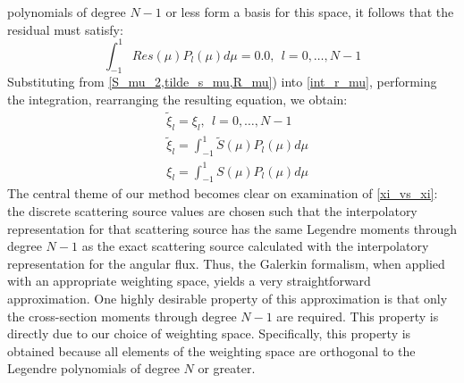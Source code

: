 polynomials of degree $N-1$ or less form a basis for this space, it follows
that the residual must satisfy:
\begin{equation}
\int_{-1}^1 Res(\mu) P_l(\mu) d\mu = 0.0,\ \ l=0,\hdots,N-1
\label{int_r_mu}
\end{equation}
Substituting from \cref{S_mu_2,tilde_s_mu,R_mu}) into \cref{int_r_mu}, 
performing the integration, rearranging the resulting equation, we obtain:
\begin{align}
&\tilde{\xi}_l = \xi_l,\ \ l=0,\hdots,N-1 \label{xi_vs_xi}\\
&\tilde{\xi}_l = \int_{-1}^1 \tilde{S}(\mu) P_l(\mu) d\mu\\
&\xi_l = \int_{-1}^1 S(\mu) P_l(\mu) d\mu
\end{align}
The central theme of our method becomes clear on examination of 
\cref{xi_vs_xi}: the discrete scattering source values are chosen such that
the interpolatory representation for that scattering source has the same
Legendre moments through degree $N-1$ as the exact scattering source
calculated with the interpolatory representation for the angular flux. Thus,
the Galerkin formalism, when applied with an appropriate weighting space,
yields a very straightforward approximation. One highly desirable property of
this approximation is that only the cross-section moments through degree $N-1$
are required. This property is directly due to our choice of weighting space.
Specifically, this property is obtained because all elements of the weighting
space are orthogonal to the Legendre polynomials of degree $N$ or greater.

